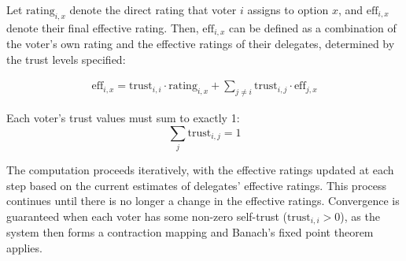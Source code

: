 Let \( \text{rating}_{i,x} \) denote the direct rating that voter \( i \) assigns to option \( x \), and \( \text{eff}_{i,x} \) denote their final effective rating. Then, \( \text{eff}_{i,x} \) can be defined as a combination of the voter's own rating and the effective ratings of their delegates, determined by the trust levels specified:

\begin{gather}
  \text{eff}_{i,x} = \text{trust}_{i,i} \cdot \text{rating}_{i,x} + \sum_{j \neq i} \text{trust}_{i,j} \cdot \text{eff}_{j,x}
\end{gather}

Each voter's trust values must sum to exactly 1:
\[
\sum_{j} \text{trust}_{i,j} = 1
\]

The computation proceeds iteratively, with the effective ratings updated at each step based on the current estimates of delegates' effective ratings. This process continues until there is no longer a change in the effective ratings. Convergence is guaranteed when each voter has some non-zero self-trust (\( \text{trust}_{i,i} > 0 \)), as the system then forms a contraction mapping and Banach's fixed point theorem applies.






